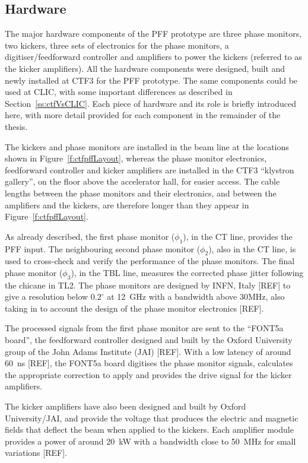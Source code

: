 \subsection{Hardware}
\label{ss:ctfPFFHardware}

The major hardware components of the PFF prototype are three phase monitors, two kickers, three sets of electronics for the phase monitors, a digitiser/feedforward controller and amplifiers to power the kickers (referred to as the kicker amplifiers). All the hardware components were designed, built and newly installed at CTF3 for the PFF prototype. The same components could be used at CLIC, with some important differences as described in Section~\ref{ss:ctfVsCLIC}. Each piece of hardware and its role is briefly introduced here, with more detail provided for each component in the remainder of the thesis.

The kickers and phase monitors are installed in the beam line at the locations shown in Figure~\ref{f:ctfpffLayout}, whereas the phase monitor electronics, feedforward controller and kicker amplifiers are installed in the CTF3 ``klystron gallery'', on the floor above the accelerator hall, for easier access. The cable lengths between the phase monitors and their electronics, and between the amplifiers and the kickers, are therefore longer than they appear in Figure~\ref{f:ctfpffLayout}.

As already described, the first phase monitor (\(\phi_1\)), in the CT line, provides the PFF input. The neighbouring second phase monitor (\(\phi_2\)), also in the CT line, is used to cross-check and verify the performance of the phase monitors. The final phase monitor (\(\phi_3\)), in the TBL line, measures the corrected phase jitter following the chicane in TL2. The phase monitors are designed by INFN, Italy [REF] to give a resolution below \(0.2^\circ\) at 12~GHz with a bandwidth above 30MHz, also taking in to account the  design of the phase monitor electronics [REF].

The processed signals from the first phase monitor are sent to the ``FONT5a board'', the feedforward controller designed and built by the Oxford University group of the John Adams Institute (JAI) [REF]. With a low latency of around 60~ns [REF], the FONT5a board digitises the phase monitor signals, calculates the appropriate correction to apply and provides the drive signal for the kicker amplifiers.

The kicker amplifiers have also been designed and built by Oxford University/JAI, and provide the voltage that produces the electric and magnetic fields that deflect the beam when applied to the kickers. Each amplifier module provides a power of around 20~kW with a bandwidth close to 50~MHz for small variations [REF]. 

